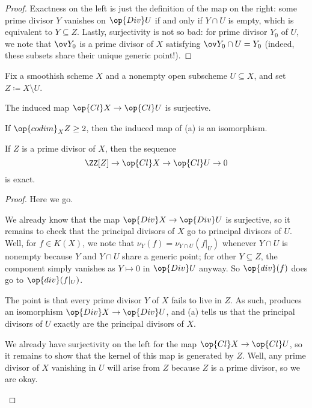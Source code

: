 \documentclass[../notes.tex]{subfiles}
\begin{document}
\begin{proof}
	Exactness on the left is just the definition of the map on the right: some prime divisor $Y$ vanishes on $\op{Div}U$ if and only if $Y\cap U$ is empty, which is equivalent to $Y\subseteq Z$. Lastly, surjectivity is not so bad: for prime divisor $Y_0$ of $U$, we note that $\ov Y_0$ is a prime divisor of $X$ satisfying $\ov Y_0\cap U=Y_0$ (indeed, these subsets share their unique generic point!).
\end{proof}
\begin{proposition} \label{prop:cl-exact-seq}
	Fix a smoothish scheme $X$ and a nonempty open subscheme $U\subseteq X$, and set $Z\coloneqq X\setminus U$.
	\begin{listalph}
		\item The induced map $\op{Cl}X\to\op{Cl}U$ is surjective.
		\item If $\op{codim}_XZ\ge2$, then the induced map of (a) is an isomorphism.
		\item If $Z$ is a prime divisor of $X$, then the sequence
		\[\ZZ[Z]\to\op{Cl}X\to\op{Cl}U\to0\]
		is exact.
	\end{listalph}
\end{proposition}
\begin{proof}
	Here we go.
	\begin{listalph}
		\item We already know that the map $\op{Div}X\to\op{Div}U$ is surjective, so it remains to check that the principal divisors of $X$ go to principal divisors of $U$. Well, for $f\in K(X)$, we note that $\nu_Y(f)=\nu_{Y\cap U}(f|_U)$ whenever $Y\cap U$ is nonempty because $Y$ and $Y\cap U$ share a generic point; for other $Y\subseteq Z$, the component simply vanishes as $Y\mapsto0$ in $\op{Div}U$ anyway. So $\op{div}(f)$ does go to $\op{div}(f|_U)$.
		\item The point is that every prime divisor $Y$ of $X$ fails to live in $Z$. As such,  produces an isomorphism $\op{Div}X\to\op{Div}U$, and (a) tells us that the principal divisors of $U$ exactly are the principal divisors of $X$.
		\item We already have surjectivity on the left for the map $\op{Cl}X\to\op{Cl}U$, so it remains to show that the kernel of this map is generated by $Z$. Well, any prime divisor of $X$ vanishing in $U$ will arise from $Z$ because $Z$ is a prime divisor, so we are okay.
		\qedhere
	\end{listalph}
\end{proof}
\end{document}
